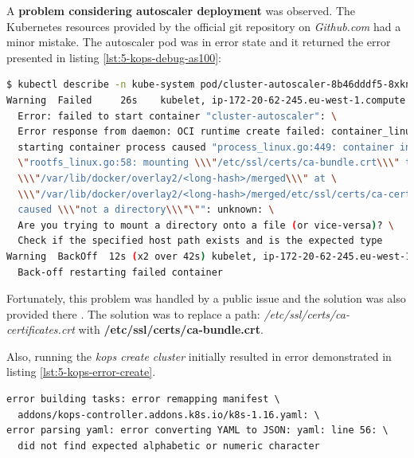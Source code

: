 A \textbf{problem considering autoscaler deployment} was observed. The Kubernetes resources provided by the official git repository on \textit{Github.com} had a minor mistake. The autoscaler pod was in error state and it returned the error presented in listing \ref{lst:5-kops-debug-as100}:
\begin{lstlisting}[basicstyle=\scriptsize,xleftmargin=0cm,label=lst:5-kops-debug-as100,caption={Debugging autoscaler},captionpos=b,language=Bash]
$ kubectl describe -n kube-system pod/cluster-autoscaler-8b46dddf5-8xkns
Warning  Failed     26s    kubelet, ip-172-20-62-245.eu-west-1.compute.internal \
  Error: failed to start container "cluster-autoscaler": \
  Error response from daemon: OCI runtime create failed: container_linux.go:346:\
  starting container process caused "process_linux.go:449: container init caused\
  \"rootfs_linux.go:58: mounting \\\"/etc/ssl/certs/ca-bundle.crt\\\" to rootfs \
  \\\"/var/lib/docker/overlay2/<long-hash>/merged\\\" at \
  \\\"/var/lib/docker/overlay2/<long-hash>/merged/etc/ssl/certs/ca-certificates.crt\\\"\
  caused \\\"not a directory\\\"\"": unknown: \
  Are you trying to mount a directory onto a file (or vice-versa)? \
  Check if the specified host path exists and is the expected type
Warning  BackOff  12s (x2 over 42s) kubelet, ip-172-20-62-245.eu-west-1.compute.internal\
  Back-off restarting failed container
\end{lstlisting}

Fortunately, this problem was handled by a public issue and the solution was also provided there \cite{as-github-issue}. The solution was to replace a path: \textit{/etc/ssl/certs/ca-certificates.crt} with \textbf{/etc/ssl/certs/ca-bundle.crt}.

Also, running the \textit{kops create cluster} initially resulted in error demonstrated in listing \ref{lst:5-kops-error-create}.
\begin{lstlisting}[basicstyle=\scriptsize,xleftmargin=0cm,label=lst:5-kops-error-create,caption={Error output of \textit{kops create cluster} command}]
error building tasks: error remapping manifest \
  addons/kops-controller.addons.k8s.io/k8s-1.16.yaml: \
error parsing yaml: error converting YAML to JSON: yaml: line 56: \
  did not find expected alphabetic or numeric character
\end{lstlisting}

